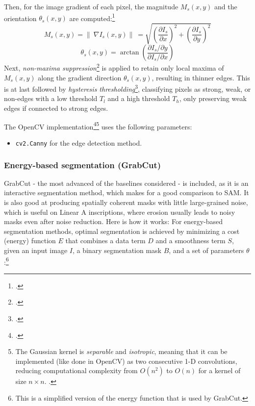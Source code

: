 Then, for the image gradient of each pixel, the magnitude $M_s(x,y)$ and the orientation $\theta_s(x,y)$ are computed:\footcite[p.~730]{DigitalImageProcessing}
$$M_s(x,y) = \|\ \nabla I_{s}(x,y) \|\ = \sqrt{\left(\frac{\partial I_{s}}{\partial x}\right)^2 + \left(\frac{\partial I_{s}}{\partial y}\right)^2}$$ 
$$\theta_s(x,y) = \arctan \left( \frac{\partial I_{s}/\partial y}{\partial I_{s}/\partial x} \right)$$
Next, \textit{non-maxima suppression}\footcite[p.~730-731]{DigitalImageProcessing} is applied to retain only local maxima of $M_s(x,y)$ along the gradient direction $\theta_s(x,y)$, resulting in thinner edges.
This is at last followed by \textit{hysteresis thresholding}\footcite[p.~732]{DigitalImageProcessing}, classifying pixels as strong, weak, or non-edges with a low threshold $T_l$ and a high threshold $T_h$, only preserving weak edges if connected to strong edges.

\noindent{}

\noindent The OpenCV implementation\footcite{opencv_gaussian_kernel}\footnote{The Gaussian kernel is \textit{separable} and \textit{isotropic}, meaning that it can be implemented (like done in OpenCV) as two consecutive 1-D convolutions, reducing computational complexity from $O(n^2)$ to $O(n)$ for a kernel of size $n \times n$. \parencite[p.~167]{DigitalImageProcessing}.}
uses the following parameters:

\begin{itemize}
    \item \texttt{cv2.Canny} for the edge detection method.
    
\end{itemize}

\subsubsection{Energy-based segmentation (GrabCut)}
GrabCut - the most advanced of the baselines considered - is included, as it is an interactive segmentation method, which makes for a good comparison to \acs{SAM}.
It is also good at producing spatially coherent masks with little large-grained noise, which is useful on Linear A inscriptions, where erosion usually leads to noisy masks even after noise reduction.
Here is how it works:
For energy-based segmentation methods, optimal segmentation is achieved by minimizing a cost (energy) function $E$ that combines a data term $D$ and a smoothness term $S$, given an input image $I$, a binary segmentation mask $B$, and a set of parameters $\theta$:\footnote{This is a simplified version of the energy function that is used by GrabCut.}

